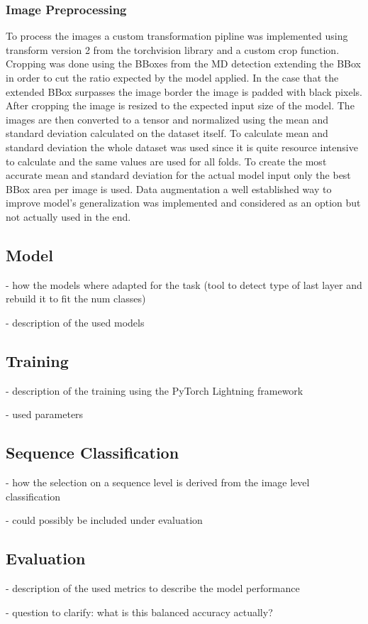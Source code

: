         \subsubsection{Image Preprocessing}
        To process the images a custom transformation pipline was implemented using transform version 2 from the torchvision library and a custom crop function.
        Cropping was done using the BBoxes from the MD detection extending the BBox in order to cut the ratio expected by the model applied.
        In the case that the extended BBox surpasses the image border the image is padded with black pixels.
        After cropping the image is resized to the expected input size of the model.
        The images are then converted to a tensor and normalized using the mean and standard deviation calculated on the dataset itself.
        To calculate mean and standard deviation the whole dataset was used since it is quite resource intensive to calculate and the same values are used for all folds.
        To create the most accurate mean and standard deviation for the actual model input only the best BBox area per image is used.
        Data augmentation a well established way to improve model's generalization \autocite{shortenSurveyImageData2019} was implemented and considered as an option but not actually used in the end.

    \subsection{Model}
    - how the models where adapted for the task (tool to detect type of last layer and rebuild it to fit the num classes)

    - description of the used models

    \subsection{Training}
    - description of the training using the PyTorch Lightning framework

    - used parameters

    \subsection{Sequence Classification}
    - how the selection on a sequence level is derived from the image level classification

    - could possibly be included under evaluation

    \subsection{Evaluation}
    - description of the used metrics to describe the model performance

    - question to clarify: what is this balanced accuracy actually?
